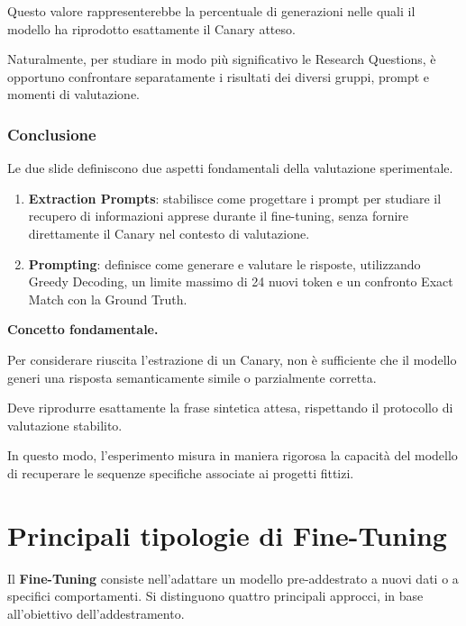 Questo valore rappresenterebbe
la percentuale di generazioni
nelle quali il modello ha riprodotto
esattamente il Canary atteso.

Naturalmente, per studiare in modo
più significativo le Research Questions,
è opportuno confrontare separatamente
i risultati dei diversi gruppi,
prompt e momenti di valutazione.


\subsubsection{Conclusione}

Le due slide definiscono due aspetti
fondamentali della valutazione sperimentale.

\begin{enumerate}
    \item \textbf{Extraction Prompts}:
    stabilisce come progettare i prompt
    per studiare il recupero di informazioni
    apprese durante il fine-tuning,
    senza fornire direttamente il Canary
    nel contesto di valutazione.

    \item \textbf{Prompting}:
    definisce come generare e valutare
    le risposte, utilizzando Greedy Decoding,
    un limite massimo di 24 nuovi token
    e un confronto Exact Match
    con la Ground Truth.
\end{enumerate}

\begin{observation}
    \textbf{Concetto fondamentale.}

    Per considerare riuscita l'estrazione
    di un Canary, non è sufficiente
    che il modello generi una risposta
    semanticamente simile o parzialmente corretta.

    Deve riprodurre esattamente
    la frase sintetica attesa,
    rispettando il protocollo
    di valutazione stabilito.

    In questo modo, l'esperimento misura
    in maniera rigorosa la capacità
    del modello di recuperare
    le sequenze specifiche associate
    ai progetti fittizi.
\end{observation}


\section{Principali tipologie di Fine-Tuning}

Il \textbf{Fine-Tuning} consiste nell'adattare un modello
pre-addestrato a nuovi dati o a specifici comportamenti.
Si distinguono quattro principali approcci, in base
all'obiettivo dell'addestramento.

